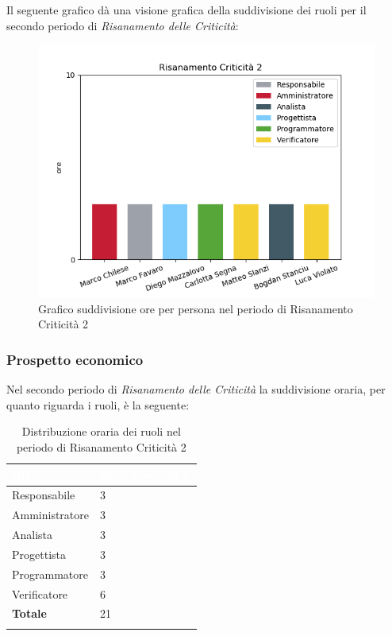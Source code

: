 Il seguente grafico dà una visione grafica della suddivisione dei ruoli per il secondo periodo di \textit{Risanamento delle Criticità}:\begin{figure}[H]
	\centering
  		\includegraphics[width=0.8\linewidth]{./images/fig_rc2.png}
  		\caption{Grafico suddivisione ore per persona nel periodo di Risanamento Criticità 2}
  		\label{fig:grafico suddivione ruoli rc2}
\end{figure}



\subsubsection{Prospetto economico}
Nel secondo periodo di \textit{Risanamento delle Criticità} la suddivisione oraria, per quanto riguarda i ruoli, è la seguente: 


\begin{longtable}{| C{.30\textwidth}| C{.15\textwidth}| C{.20\textwidth}|}
\hline
{}\textbf{\textcolor{white}{Ruolo}} & \textbf{\textcolor{white}{Ore}} & \textbf{\textcolor{white}{Costo in \euro}} \\
\hline 
Responsabile & 3 &  \\
\hline
{}Amministratore & 3 &  \\
\hline
Analista & 3 &  \\
\hline
{}Progettista & 3 & \\
\hline
Programmatore & 3 &  \\
\hline 
{}Verificatore & 6 &  \\
\hline
\textbf{Totale} & 21 &  \\
\hline 

\caption{Distribuzione oraria dei ruoli nel periodo di Risanamento Criticità 2}
\label{Distribuzione oraria per ruoli rc2}
\end{longtable}

